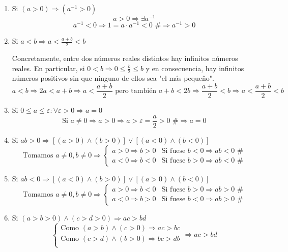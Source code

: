\documentclass[10pt,a4paper,openright]{book}
\theoremstyle{break}
\begin{document}
\begin{enumerate}
\item Si $(a>0)\Rightarrow (a^{-1}>0)$
$$a>0\Rightarrow \exists a^{-1}$$
$$a^{-1}<0\Rightarrow 1=a\cdot a^{-1}<0 \mbox{ \#}\Rightarrow a^{-1}>0$$
\vspace{0.5cm}

\item Si $a<b\Rightarrow a<\frac{a+b}{2}<b$\par
Concretamente, entre dos números reales distintos hay infinitos números reales. En particular, si $0<b\Rightarrow 0\leq \frac{b}{2}\leq b$ y en consecuencia, hay infinitos números positivos sin que ninguno de ellos sea "el más pequeño".
$$a<b\Rightarrow 2a<a+b \Rightarrow a<\frac{a+b}{2}\mbox{ pero también }a+b<2b\Rightarrow \frac{a+b}{2}<b \Rightarrow a<\frac{a+b}{2}<b$$
\vspace{0.5cm}

\item Si $0\leq a\leq \varepsilon: \forall \varepsilon>0 \Rightarrow a=0$
$$\mbox{Si }a\neq 0\Rightarrow a>0\Rightarrow a>\varepsilon=\frac{a}{2}>0\mbox{ \#}\Rightarrow a=0$$
\vspace{0.5cm}

\item Si $ab>0\Rightarrow [(a>0)\wedge (b>0)]\vee [(a<0)\wedge (b<0)]$
$$\mbox{Tomamos }a\neq 0, b\neq 0\Rightarrow 
\begin{cases}
a>0 \Rightarrow b>0 & \mbox{Si fuese } b<0\Rightarrow ab<0 \mbox{ \#}\\
a<0 \Rightarrow b<0 & \mbox{Si fuese } b>0\Rightarrow ab<0 \mbox{ \#}
\end{cases}
$$
\vspace{0.5cm}

\item Si $ab<0\Rightarrow [(a<0)\wedge (b>0)]\vee [(a>0)\wedge (b<0)]$
$$\mbox{Tomamos }a\neq 0, b\neq 0\Rightarrow 
\begin{cases}
a>0 \Rightarrow b<0 & \mbox{Si fuese } b>0\Rightarrow ab>0 \mbox{ \#}\\
a<0 \Rightarrow b>0 & \mbox{Si fuese } b<0\Rightarrow ab>0 \mbox{ \#}
\end{cases}
$$
\vspace{0.5cm}

\item Si $(a>b>0)\wedge (c>d>0)\Rightarrow ac>bd$
$$
\begin{cases}
\mbox{Como } (a>b) \wedge (c>0)\Rightarrow ac>bc   \\
\mbox{Como } (c>d) \wedge (b>0)\Rightarrow bc>db   \\
\end{cases}
\Rightarrow ac>bd
$$
\vspace{0.5cm}


\end{enumerate}
\end{document}
